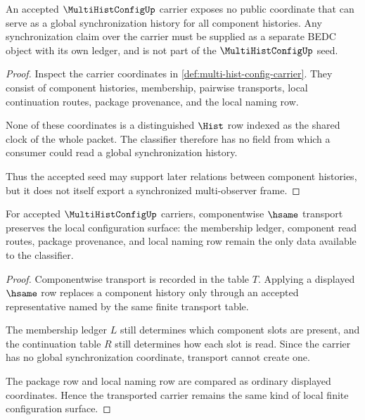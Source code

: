 \begin{theorem}
\label{thm:multi-hist-config-no-global-sync-scope}
An accepted $\MultiHistConfigUp$ carrier exposes no public coordinate that can serve as a global synchronization history for all component histories. Any synchronization claim over the carrier must be supplied as a separate BEDC object with its own ledger, and is not part of the $\MultiHistConfigUp$ seed.
\end{theorem}
\begin{proof}
Inspect the carrier coordinates in \autoref{def:multi-hist-config-carrier}. They consist of component histories, membership, pairwise transports, local continuation routes, package provenance, and the local naming row.

None of these coordinates is a distinguished $\Hist$ row indexed as the shared clock of the whole packet. The classifier therefore has no field from which a consumer could read a global synchronization history.

Thus the accepted seed may support later relations between component histories, but it does not itself export a synchronized multi-observer frame.
\end{proof}

\begin{theorem}
\label{thm:multi-hist-config-hsame-transport}
For accepted $\MultiHistConfigUp$ carriers, componentwise $\hsame$ transport preserves the local configuration surface: the membership ledger, component read routes, package provenance, and local naming row remain the only data available to the classifier.
\end{theorem}
\begin{proof}
Componentwise transport is recorded in the table $T$. Applying a displayed $\hsame$ row replaces a component history only through an accepted representative named by the same finite transport table.

The membership ledger $L$ still determines which component slots are present, and the continuation table $R$ still determines how each slot is read. Since the carrier has no global synchronization coordinate, transport cannot create one.

The package row and local naming row are compared as ordinary displayed coordinates. Hence the transported carrier remains the same kind of local finite configuration surface.
\end{proof}


